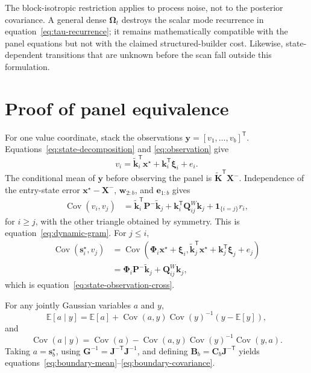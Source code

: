 \documentclass[11pt]{article}
\newcommand{\ve}[1]{\boldsymbol{#1}}
\newcommand{\tr}{\mathsf{T}}
\newcommand{\E}{\mathbb{E}}
\DeclareMathOperator{\Cov}{Cov}
\begin{document}
The block-isotropic restriction applies to process noise, not to the posterior covariance.  A
general dense $\ve{\Omega}_t$ destroys the scalar mode recurrence in
equation~\eqref{eq:tau-recurrence}; it remains mathematically compatible with the panel equations
but not with the claimed structured-builder cost.  Likewise, state-dependent transitions that
are unknown before the scan fall outside this formulation.

\appendix

\section{Proof of panel equivalence}
\label{app:proof}

For one value coordinate, stack the observations
$\ve{y}=[v_1,\ldots,v_b]^{\tr}$.  Equations~\eqref{eq:state-decomposition} and
\eqref{eq:observation} give
\begin{equation}
  v_i
  =\widetilde{\ve{k}}_i^{\tr}\ve{x}^\star
   +\ve{k}_i^{\tr}\ve{\xi}_i+e_i.
\end{equation}
The conditional mean of $\ve{y}$ before observing the panel is
$\widetilde{\ve{K}}^{\tr}\ve{X}^-$.  Independence of the entry-state error
$\ve{x}^\star-\ve{X}^-$, $\ve{w}_{2:b}$, and $\ve{e}_{1:b}$ gives
\begin{align}
  \Cov(v_i,v_j)
  &=\widetilde{\ve{k}}_i^{\tr}\ve{P}^-
    \widetilde{\ve{k}}_j
    +\ve{k}_i^{\tr}\ve{Q}_{ij}^{W}\ve{k}_j
    +\mathbf{1}_{\{i=j\}}r_i,
\end{align}
for $i\geq j$, with the other triangle obtained by symmetry.  This is
equation~\eqref{eq:dynamic-gram}.  For $j\leq i$,
\begin{align}
  \Cov(\ve{s}_i^\star,v_j)
  &=\Cov(\ve{\Phi}_i\ve{x}^\star+\ve{\xi}_i,
    \widetilde{\ve{k}}_j^{\tr}\ve{x}^\star
    +\ve{k}_j^{\tr}\ve{\xi}_j+e_j)\\
  &=\ve{\Phi}_i\ve{P}^-\widetilde{\ve{k}}_j
    +\ve{Q}_{ij}^{W}\ve{k}_j,
\end{align}
which is equation~\eqref{eq:state-observation-cross}.

For any jointly Gaussian variables $a$ and $y$,
\begin{equation}
  \E[a\mid y]
  =\E[a]+\Cov(a,y)\Cov(y)^{-1}(y-\E[y]),
  \label{eq:gaussian-conditional-mean}
\end{equation}
and
\begin{equation}
  \Cov(a\mid y)
  =\Cov(a)-\Cov(a,y)\Cov(y)^{-1}\Cov(y,a).
  \label{eq:gaussian-conditional-covariance}
\end{equation}
Taking $a=\ve{s}_b^\star$, using
$\ve{G}^{-1}=\ve{J}^{-\tr}\ve{J}^{-1}$, and defining
$\ve{B}_b=\ve{C}_b\ve{J}^{-\tr}$ yields
equations~\eqref{eq:boundary-mean}--\eqref{eq:boundary-covariance}.
\end{document}
